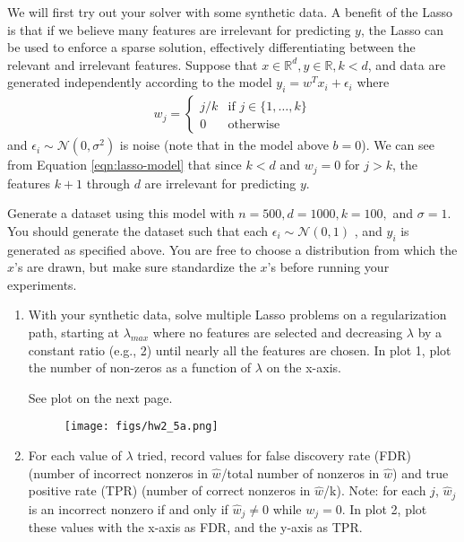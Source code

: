 \documentclass{article}
\begin{document}
\begin{aprob}
    We will first try out your solver with some synthetic data.
    A benefit of the Lasso is that if we believe many features are irrelevant for predicting ${y}$, the Lasso can be used to enforce a sparse solution, effectively differentiating between the relevant and irrelevant features.
    Suppose that ${x} \in \mathbb{R}^d, y \in \mathbb{R}, k < d$, and data are generated independently according to the model $y_i = w^T x_i + \epsilon_i$ where
    \begin{align}
        w_j = \begin{cases} j/k & \text{if } j \in \{1,\dots,k\} \\
        0 & \text{otherwise}
        \end{cases}\label{eqn:lasso-model}
    \end{align} 
    and $\epsilon_i \sim \mathcal{N}(0, \sigma^2)$ is noise (note that in the model above $b=0$). We can see from Equation \eqref{eqn:lasso-model} that since $k < d$ and $w_j = 0$ for $j > k$, the features $k + 1$ through $d$ are irrelevant for predicting $y$.
    
    Generate a dataset using this model with $n = 500, d = 1000, k = 100,$ and $\sigma = 1$. You should generate the dataset such that each $\epsilon_i \sim \mathcal{N}(0, 1)$ , and $y_i$ is generated as specified above. You are free to choose a distribution from which the $x$'s are drawn, but make sure standardize the $x$'s before running your experiments.

    \begin{enumerate}
        \item {} With your synthetic data, solve multiple Lasso problems on a regularization path, starting at $\lambda_{max}$ where no features are selected and decreasing $\lambda$ by a constant ratio (e.g., 2) until nearly all the features are chosen. 
        In plot 1, plot the number of non-zeros as a function of $\lambda$ on the x-axis.
        
        See plot on the next page.
        
        \begin{figure}[htp] 
        \centering
        \vspace*{-0.1in}
        \texttt{[image: figs/hw2\_5a.png]}
        \label{figs:hw2_5a.png}
        \end{figure}
        
        \item {} For each value of $\lambda$ tried, record values for false discovery rate (FDR) (number of incorrect nonzeros in $\widehat{w}$/total number of nonzeros in $\widehat{w}$) and true positive rate (TPR)
        (number of correct nonzeros in $\widehat{w}$/k). Note: for each $j$, $\widehat{w}_j$ is an incorrect nonzero if and only if $\widehat{w}_j \neq 0$ while $w_j = 0$.
        In plot 2, plot these values with the x-axis as FDR, and the y-axis as TPR.
          

\end{enumerate}
\end{aprob}
\end{document}

